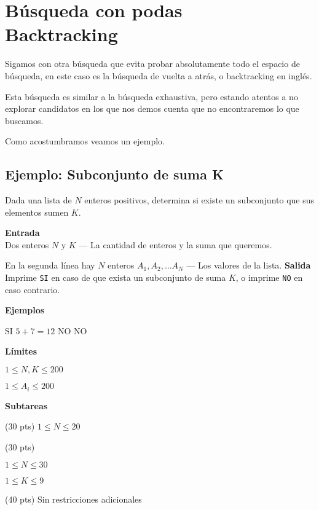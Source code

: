 \chapter[Búsqueda con podas]{Búsqueda con podas\\ Backtracking}

Sigamos con otra búsqueda que evita probar absolutamente todo el espacio de búsqueda, en este caso es la búsqueda de vuelta a atrás, o backtracking en inglés.

Esta búsqueda es similar a la búsqueda exhaustiva, pero estando atentos a no explorar candidatos en los que nos demos cuenta que no encontraremos lo que buscamos.

Como acostumbramos veamos un ejemplo.

\section{Ejemplo: Subconjunto de suma K}

Dada una lista de \(N\) enteros positivos, determina si existe un subconjunto que sus elementos sumen \(K\).

\textbf{Entrada}\\
Dos enteros \(N\) y \(K\) --- La cantidad de enteros y la suma que queremos.

En la segunda línea hay \(N\) enteros \(A_1, A_2, \ldots A_N\) --- Los valores de la lista.
\textbf{Salida}\\
Imprime \verb|SI| en caso de que exista un subconjunto de suma \(K\), o imprime \verb|NO| en caso contrario.

\textbf{Ejemplos}\\
\begin{casebox3}
	 {
	SI
	}
	{
		\(5+7=12\)
	}
	 {
		NO
	}
	{
	}
	 {
	NO
	}
	{	
	}
\end{casebox3}

\textbf{Límites}
\begin{plimits}
	\item \(1\leq N,K \leq 200\)
	\item \(1\leq A_i \leq 200\)
\end{plimits}
	
\textbf{Subtareas}
\begin{plimits}
	\item (30 pts) \(1\leq N \leq 20\)
	\item (30 pts)
	\begin{plimits}
		\item \(1\leq N \leq 30\)
		\item \(1\leq K \leq 9\)		
	\end{plimits}
	\item (40 pts) Sin restricciones adicionales
\end{plimits}

